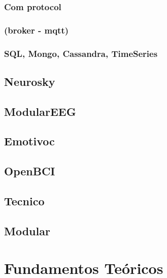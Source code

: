 \subsubsection{Com protocol}
\label{sec:org0a31dc6}
\subsubsection{(broker - mqtt)}
\label{sec:org0205de2}
\subsubsection{SQL, Mongo, Cassandra, TimeSeries}
\label{sec:org1958b90}


\subsection{Neurosky}
\label{sec:org49f1f6f}
\subsection{ModularEEG}
\label{sec:org6a32a88}
\subsection{Emotivoc}
\label{sec:org495d2ee}
\subsection{OpenBCI}
\label{sec:orgb7f02f4}

\subsection{Tecnico}
\label{sec:orgfd9e4cb}
\subsection{Modular}
\label{sec:org4eca4fd}
\section{Fundamentos Teóricos}
\label{sec:orgf7ded14}
